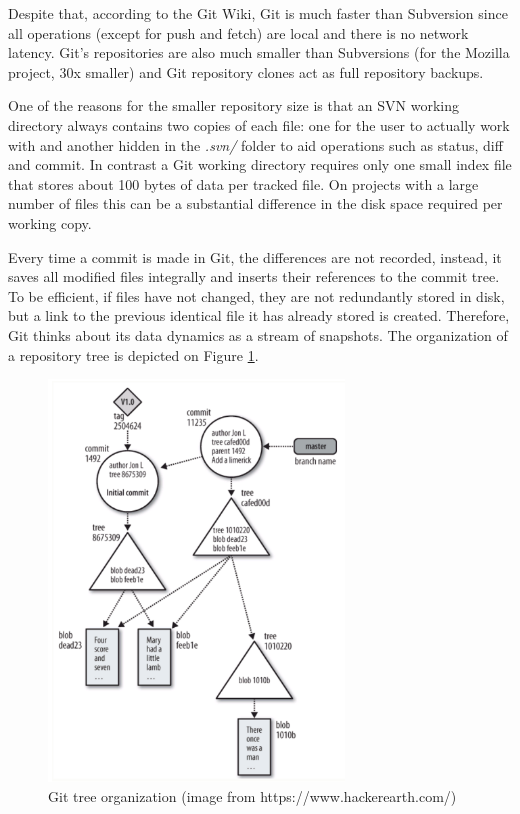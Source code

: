Despite that, according to the Git Wiki\cite{ref:gitwiki}, Git is much faster than Subversion since all operations (except for push and fetch) are local and there is no network latency. Git's repositories are also much smaller than Subversions (for the Mozilla project, 30x smaller) and Git repository clones act as full repository backups.

One of the reasons for the smaller repository size is that an SVN working directory always contains two copies of each file: one for the user to actually work with and another hidden in the \textit{.svn/} folder to aid operations such as status, diff and commit. In contrast a Git working directory requires only one small index file that stores about 100 bytes of data per tracked file. On projects with a large number of files this can be a substantial difference in the disk space required per working copy.

Every time a commit is made in Git, the differences are not recorded, instead, it saves all modified files integrally and inserts their references to the commit tree. To be efficient, if files have not changed, they are not redundantly stored in disk, but a link to the previous identical file it has already stored is created. Therefore, Git thinks about its data dynamics as a stream of snapshots. The organization of a repository tree is depicted on Figure \ref{fig:git_architecture}.

\begin{figure}[h]
	\centering
	\includegraphics[width=0.7\textwidth]{figures/git_architecture.png}
	\caption{Git tree organization (image from https://www.hackerearth.com/)}
	\label{fig:git_architecture}
\end{figure}

